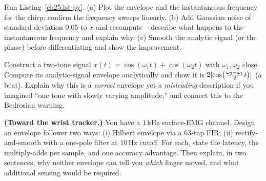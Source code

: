 \begin{exercise}
\label{ch25:ex-code}
Run Listing~\ref{ch25:lst-py}. (a) Plot the envelope and the instantaneous frequency for
the chirp; confirm the frequency sweeps linearly. (b) Add Gaussian noise of standard
deviation $0.05$ to $x$ and recompute -- describe what happens to the instantaneous
frequency and explain why. (c) Smooth the analytic signal (or the phase) before
differentiating and show the improvement.
\end{exercise}

\begin{exercise}
\label{ch25:ex-bedrosian}
Construct a two-tone signal $x(t)=\cos(\omega_1 t)+\cos(\omega_2 t)$ with $\omega_1,
\omega_2$ close. Compute its analytic-signal envelope analytically and show it is
$2\lvert\cos\!\big(\tfrac{\omega_2-\omega_1}{2}t\big)\rvert$ (a beat). Explain why this is a
\emph{correct} envelope yet a \emph{misleading} description if you imagined ``one tone with
slowly varying amplitude,'' and connect this to the Bedrosian warning.
\end{exercise}

\begin{exercise}
\label{ch25:ex-emg}
\textbf{(Toward the wrist tracker.)} You have a $1$\,kHz surface-EMG channel. Design an
envelope follower two ways: (i) Hilbert envelope via a $63$-tap FIR; (ii)
rectify-and-smooth with a one-pole filter at $10$\,Hz cutoff. For each, state the latency,
the multiply-adds per sample, and one accuracy advantage. Then explain, in two sentences,
why neither envelope can tell you \emph{which} finger moved, and what additional sensing
would be required.
\end{exercise}
